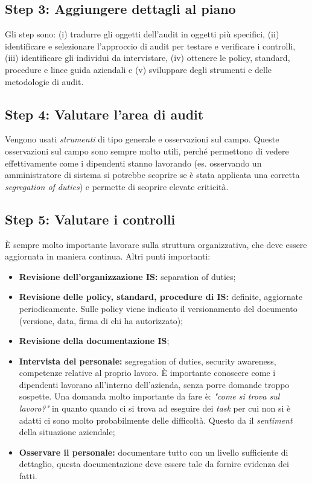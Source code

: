 \subsection{Step 3: Aggiungere dettagli al piano}

Gli step sono: (i) tradurre gli oggetti dell'audit in oggetti più specifici,
(ii) identificare e selezionare l'approccio di audit per testare e verificare i
controlli, (iii) identificare gli individui da intervistare, (iv) ottenere le
policy, standard, procedure e linee guida aziendali e (v) sviluppare degli
strumenti e delle metodologie di audit.

\subsection{Step 4: Valutare l'area di audit}

Vengono usati \textit{strumenti} di tipo generale e osservazioni sul campo.
Queste osservazioni sul campo sono sempre molto utili, perché permettono di
vedere effettivamente come i dipendenti stanno lavorando (es. osservando
un amministratore di sistema si potrebbe scoprire se è stata applicata una
corretta \textit{segregation of duties}) e permette di scoprire elevate
criticità.

\subsection{Step 5: Valutare i controlli}

È sempre molto importante lavorare sulla struttura organizzativa, che deve
essere aggiornata in maniera continua.
Altri punti importanti:
\begin{itemize}
\item \textbf{Revisione dell'organizzazione IS:} separation of duties;
\item \textbf{Revisione delle policy, standard, procedure di IS:} definite,
aggiornate periodicamente. Sulle policy viene indicato il versionamento del
documento (versione, data, firma di chi ha autorizzato);
\item \textbf{Revisione della documentazione IS};
\item \textbf{Intervista del personale:} segregation of duties, security
awareness, competenze relative al proprio lavoro. È importante conoscere come i
dipendenti lavorano all'interno dell'azienda, senza porre domande troppo
sospette. Una domanda molto importante da fare è: \textit{"come si trova sul
lavoro?"} in quanto quando ci si trova ad eseguire dei \textit{task}
per cui non si è adatti ci sono molto probabilmente delle difficoltà. Questo da
il \textit{sentiment} della situazione aziendale;
\item \textbf{Osservare il personale:} documentare tutto con un livello
sufficiente di dettaglio, questa documentazione deve essere tale
da fornire evidenza dei fatti.
\end{itemize}


